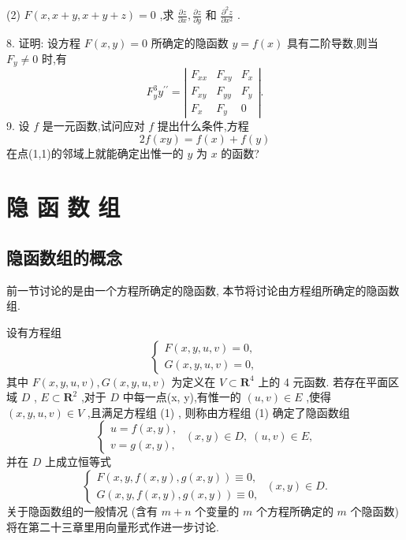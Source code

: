 (2) \(F\left( {x,x + y,x + y + z}\right)  = 0\) ,求 \(\frac{\partial z}{\partial x},\frac{\partial z}{\partial y}\) 和 \(\frac{{\partial }^{2}z}{\partial {x}^{2}}\) .

8. 证明: 设方程 \(F\left( {x,y}\right)  = 0\) 所确定的隐函数 \(y = f\left( x\right)\) 具有二阶导数,则当 \({F}_{y} \neq  0\) 时,有
\[
{F}_{y}^{3}{y}^{\prime \prime } = \left| \begin{matrix} {F}_{xx} & {F}_{xy} & {F}_{x} \\  {F}_{xy} & {F}_{yy} & {F}_{y} \\  {F}_{x} & {F}_{y} & 0 \end{matrix}\right| .
\]
9. 设 \(f\) 是一元函数,试问应对 \(f\) 提出什么条件,方程
\[
{2f}\left( {xy}\right)  = f\left( x\right)  + f\left( y\right)
\]
在点(1,1)的邻域上就能确定出惟一的 \(y\) 为 \(x\) 的函数?

\section{隐 函 数 组}

\subsection{隐函数组的概念}

前一节讨论的是由一个方程所确定的隐函数, 本节将讨论由方程组所确定的隐函数组.

设有方程组
\[
\left\{  \begin{array}{l} F\left( {x,y,u,v}\right)  = 0, \\  G\left( {x,y,u,v}\right)  = 0, \end{array}\right.  \tag{1}
\]
其中 \(F\left( {x,y,u,v}\right) ,G\left( {x,y,u,v}\right)\) 为定义在 \(V \subset  {\mathbf{R}}^{4}\) 上的 4 元函数. 若存在平面区域 \(D\) , \(E \subset  {\mathbf{R}}^{2}\) ,对于 \(D\) 中每一点(x, y),有惟一的 \(\left( {u,v}\right)  \in  E\) ,使得 \(\left( {x,y,u,v}\right)  \in  V\) ,且满足方程组 (1) , 则称由方程组 (1) 确定了隐函数组
\[
\left\{  {\begin{array}{l} u = f\left( {x,y}\right) , \\  v = g\left( {x,y}\right) , \end{array}\;\left( {x,y}\right)  \in  D,\;\left( {u,v}\right)  \in  E,}\right.
\]
并在 \(D\) 上成立恒等式
\[
\left\{  {\begin{array}{l} F\left( {x,y,f\left( {x,y}\right) ,g\left( {x,y}\right) }\right)  \equiv  0, \\  G\left( {x,y,f\left( {x,y}\right) ,g\left( {x,y}\right) }\right)  \equiv  0, \end{array}\;\left( {x,y}\right)  \in  D.}\right.
\]
关于隐函数组的一般情况 (含有 \(m + n\) 个变量的 \(m\) 个方程所确定的 \(m\) 个隐函数) 将在第二十三章里用向量形式作进一步讨论.

